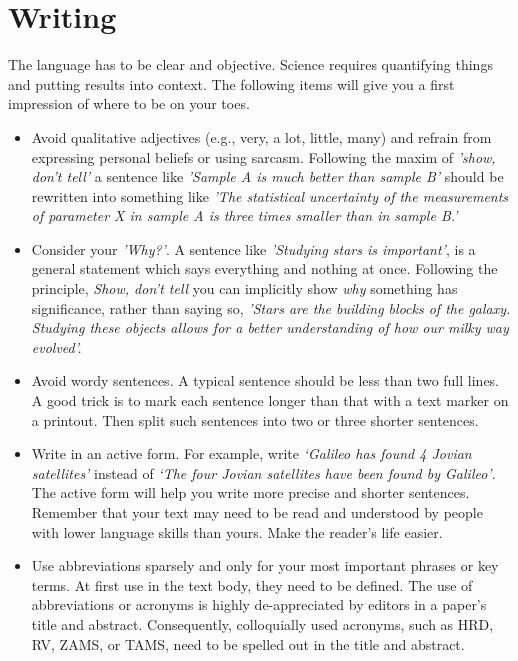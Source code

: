 \section*{Writing}
\noindent
The language has to be clear and objective. Science requires quantifying things and putting results into context. The following items will give you a first impression of where to be on your toes.
\begin{itemize}
    \item  Avoid qualitative adjectives (e.g., very, a lot, little, many) and refrain from expressing personal beliefs or using sarcasm. Following the maxim of \textit{'show, don't tell'} a sentence like \textit{'Sample A is much better than sample B'} should be rewritten into something like \textit{'The statistical uncertainty of the measurements of parameter X in sample A is three times smaller than in sample B.'}
    
    \item Consider your \textit{'Why?'}. A sentence like \textit{'Studying stars is important'}, is a general statement which says everything and nothing at once. Following the principle,  \textit{Show, don't tell} you can implicitly show \textit{why} something has significance, rather than saying so, \textit{'Stars are the building blocks of the galaxy. Studying these objects allows for a better understanding of how our milky way evolved'.}
    
    \item Avoid wordy sentences. A typical sentence should be less than two full lines. A good trick is to mark each sentence longer than that with a text marker on a printout.  Then split such sentences into two or three shorter sentences.
    
    \item Write in an active form. For example, write \textit{`Galileo has found 4 Jovian satellites'} instead of \textit{`The four Jovian satellites have been found by Galileo'}. The active form will help you write more precise and shorter sentences. Remember that your text may need to be read and understood by people with lower language skills than yours. Make the reader's life easier.

    \item Use abbreviations sparsely and only for your most important phrases or key terms. At first use in the text body, they need to be defined. The use of abbreviations or acronyms is highly de-appreciated by editors in a paper's title and abstract. Consequently, colloquially used acronyms, such as HRD, RV, ZAMS, or TAMS, need to be spelled out in the title and abstract. 


\end{itemize}
